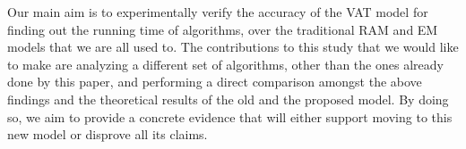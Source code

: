Our main aim is to experimentally verify the accuracy of the VAT model for finding out the running time of algorithms, over the traditional RAM and EM models that we are all used to. The contributions to this study that we would like to make are analyzing a different set of algorithms, other than the ones already done by this paper, and performing a direct comparison amongst the above findings and the theoretical results of the old and the proposed model. By doing so, we aim to provide a concrete evidence that will either support moving to this new model or disprove all its claims.
